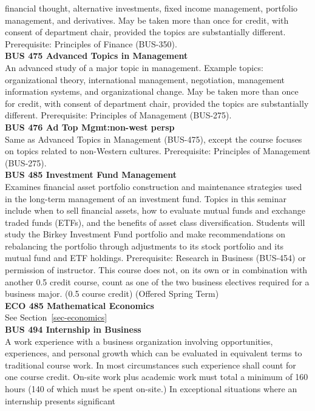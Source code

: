 \documentclass[
  letterpaper,
]{scrbook}
\begin{document}
financial thought, alternative investments, fixed income management,
portfolio management, and derivatives. May be taken more than once for
credit, with consent of department chair, provided the topics are
substantially different. Prerequisite: Principles of Finance
(BUS-350).\\
\textbf{BUS 475 Advanced Topics in Management}\\
An advanced study of a major topic in management. Example topics:
organizational theory, international management, negotiation, management
information systems, and organizational change. May be taken more than
once for credit, with consent of department chair, provided the topics
are substantially different. Prerequisite: Principles of Management
(BUS-275).\\
\textbf{BUS 476 Ad Top Mgmt:non-west persp}\\
Same as Advanced Topics in Management (BUS-475), except the course
focuses on topics related to non-Western cultures. Prerequisite:
Principles of Management (BUS-275).\\
\textbf{BUS 485 Investment Fund Management}\\
Examines financial asset portfolio construction and maintenance
strategies used in the long-term management of an investment fund.
Topics in this seminar include when to sell financial assets, how to
evaluate mutual funds and exchange traded funds (ETFs), and the benefits
of asset class diversification. Students will study the Birkey
Investment Fund portfolio and make recommendations on rebalancing the
portfolio through adjustments to its stock portfolio and its mutual fund
and ETF holdings. Prerequisite: Research in Business (BUS-454) or
permission of instructor. This course does not, on its own or in
combination with another 0.5 credit course, count as one of the two
business electives required for a business major. (0.5 course credit)
(Offered Spring Term)\\
\textbf{ECO 485 Mathematical Economics}\\
See Section~\ref{sec-economics}\\
\textbf{BUS 494 Internship in Business}\\
A work experience with a business organization involving opportunities,
experiences, and personal growth which can be evaluated in equivalent
terms to traditional course work. In most circumstances such experience
shall count for one course credit. On-site work plus academic work must
total a minimum of 160 hours (140 of which must be spent on-site.) In
exceptional situations where an internship presents significant
\end{document}
